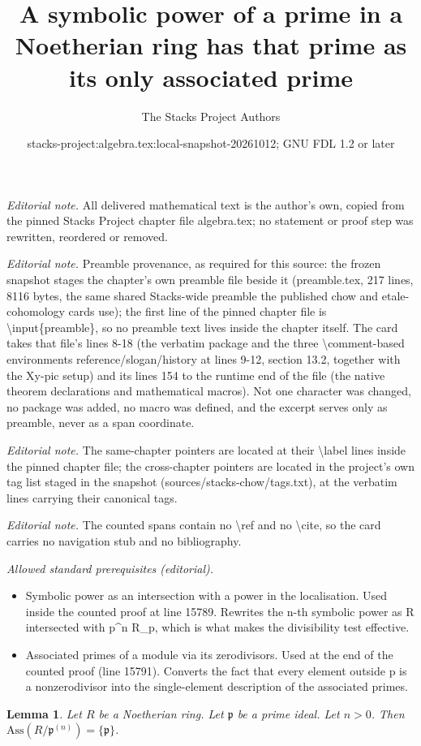\documentclass[10pt,a4paper]{amsart}
\title{A symbolic power of a prime in a Noetherian ring has that prime as its only associated prime}
\author{The Stacks Project Authors}
\date{stacks-project:algebra.tex:local-snapshot-20261012; GNU FDL 1.2 or later}
\theoremstyle{plain}
\newtheorem{lemma}[subsection]{Lemma}
\theoremstyle{definition}
\theoremstyle{remark}
\numberwithin{equation}{subsection}
\begin{document}
\maketitle
\noindent\textit{Editorial note.} All delivered mathematical text is the author's own, copied from the pinned Stacks Project chapter file algebra.tex; no statement or proof step was rewritten, reordered or removed.\par\medskip
\noindent\textit{Editorial note.} Preamble provenance, as required for this source: the frozen snapshot stages the chapter's own preamble file beside it (preamble.tex, 217 lines, 8116 bytes, the same shared Stacks-wide preamble the published chow and etale-cohomology cards use); the first line of the pinned chapter file is \textbackslash{}input\{preamble\}, so no preamble text lives inside the chapter itself. The card takes that file's lines 8-18 (the verbatim package and the three \textbackslash{}comment-based environments reference/slogan/history at lines 9-12, section 13.2, together with the Xy-pic setup) and its lines 154 to the runtime end of the file (the native theorem declarations and mathematical macros). Not one character was changed, no package was added, no macro was defined, and the excerpt serves only as preamble, never as a span coordinate.\par\medskip
\noindent\textit{Editorial note.} The same-chapter pointers are located at their \textbackslash{}label lines inside the pinned chapter file; the cross-chapter pointers are located in the project's own tag list staged in the snapshot (sources/stacks-chow/tags.txt), at the verbatim lines carrying their canonical tags.\par\medskip
\noindent\textit{Editorial note.} The counted spans contain no \textbackslash{}ref and no \textbackslash{}cite, so the card carries no navigation stub and no bibliography.\par\medskip
\noindent\textit{Allowed standard prerequisites (editorial).}\begin{itemize}
\item Symbolic power as an intersection with a power in the localisation. Used inside the counted proof at line 15789. Rewrites the n-th symbolic power as R intersected with p\textasciicircum{}n R\_p, which is what makes the divisibility test effective.
\item Associated primes of a module via its zerodivisors. Used at the end of the counted proof (line 15791). Converts the fact that every element outside p is a nonzerodivisor into the single-element description of the associated primes.
\end{itemize}\medskip
\begin{lemma}
\label{lemma-symbolic-power-associated}
Let $R$ be a Noetherian ring.
Let $\mathfrak p$ be a prime ideal.
Let $n > 0$. Then $\text{Ass}(R/\mathfrak p^{(n)}) = \{\mathfrak p\}$.
\end{lemma}
\end{document}
